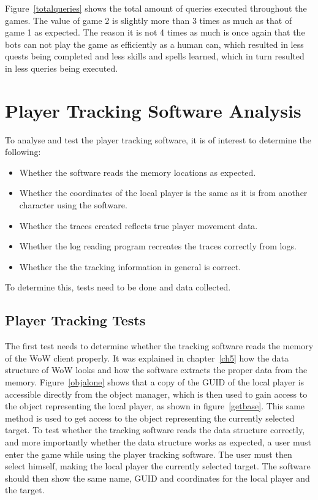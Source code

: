 Figure~\ref{totalqueries} shows the total amount of queries executed throughout the games. The value of game 2 is slightly more than 3 times as much as that of game 1 as expected. The reason it is not 4 times as much is once again that the bots can not play the game as efficiently as a human can, which resulted in less quests being completed and less skills and spells learned, which in turn resulted in less queries being executed.





\section{Player Tracking Software Analysis}

To analyse and test the player tracking software, it is of interest to determine the following:

\begin{itemize}
	\item Whether the software reads the memory locations as expected.
	\item Whether the coordinates of the local player is the same as it is from another character using the software.
	\item Whether the traces created reflects true player movement data.
	\item Whether the log reading program recreates the traces correctly from logs.
	\item Whether the the tracking information in general is correct.
\end{itemize}

To determine this, tests need to be done and data collected.

\subsection{Player Tracking Tests}

The first test needs to determine whether the tracking software reads the memory of the WoW client properly. It was explained in chapter~\ref{ch5} how the data structure of WoW looks and how the software extracts the proper data from the memory. Figure~\ref{objalone} shows that a copy of the GUID of the local player is accessible directly from the object manager, which is then used to gain access to the object representing the local player, as shown in figure~\ref{getbase}. This same method is used to get access to the object representing the currently selected target. To test whether the tracking software reads the data structure correctly, and more importantly whether the data structure works as expected, a user must enter the game while using the player tracking software. The user must then select himself, making the local player the currently selected target. The software should then show the same name, GUID and coordinates for the local player and the target.


